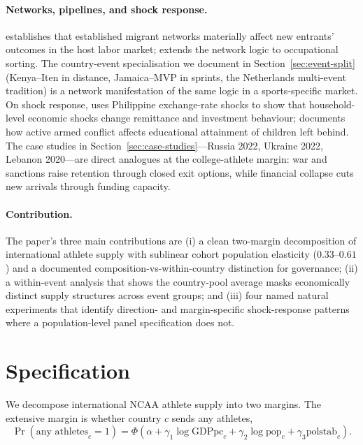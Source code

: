 \documentclass[11pt]{article}
\begin{document}
\paragraph{Networks, pipelines, and shock response.}
\citet{munshi2003networks} establishes that established migrant
networks materially affect new entrants' outcomes in the host
labor market; \citet{patel2013immigrant} extends the network
logic to occupational sorting. The country-event specialisation
we document in Section~\ref{sec:event-split} (Kenya--Iten in
distance, Jamaica--MVP in sprints, the Netherlands multi-event
tradition) is a network manifestation of the same logic in a
sports-specific market. On shock response,
\citet{yang2008international} uses Philippine exchange-rate
shocks to show that household-level economic shocks change
remittance and investment behaviour; \citet{bohra2017syrian}
documents how active armed conflict affects educational
attainment of children left behind. The case studies in
Section~\ref{sec:case-studies}---Russia 2022, Ukraine 2022,
Lebanon 2020---are direct analogues at the college-athlete
margin: war and sanctions raise retention through closed exit
options, while financial collapse cuts new arrivals through
funding capacity.

\paragraph{Contribution.} The paper's three main contributions
are (i) a clean two-margin decomposition of international athlete
supply with sublinear cohort population elasticity ($0.33$--$0.61$)
and a documented composition-vs-within-country distinction for
governance; (ii) a within-event analysis that shows the
country-pool average masks economically distinct supply
structures across event groups; and (iii) four named natural
experiments that identify direction- and margin-specific
shock-response patterns where a population-level panel
specification does not.

\section{Specification}

We decompose international NCAA athlete supply into two margins. The
extensive margin is whether country $c$ sends any athletes,
\begin{equation}
\Pr(\text{any athletes}_c = 1) = \Phi\!\left(
   \alpha + \gamma_1 \log\text{GDPpc}_c
          + \gamma_2 \log\text{pop}_c
          + \gamma_3 \text{polstab}_c
\right).
\label{eq:extensive}
\end{equation}
\end{document}
